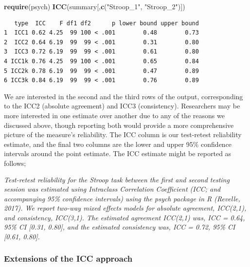 \documentclass[english,,man,floatsintext]{apa6}
\newenvironment{Shaded}{\begin{snugshade}}{\end{snugshade}}
\newcommand{\KeywordTok}[1]{\textcolor[rgb]{0.13,0.29,0.53}{\textbf{#1}}}
\newcommand{\NormalTok}[1]{#1}
\newcommand{\StringTok}[1]{\textcolor[rgb]{0.31,0.60,0.02}{#1}}
\begin{document}
\begin{Shaded}
\begin{Highlighting}[]
\KeywordTok{require}\NormalTok{(psych)}
\KeywordTok{ICC}\NormalTok{(summary[,}\KeywordTok{c}\NormalTok{(}\StringTok{"Stroop_1"}\NormalTok{, }\StringTok{"Stroop_2"}\NormalTok{)])}
\end{Highlighting}
\end{Shaded}

\begin{verbatim}
   type  ICC    F df1 df2      p lower bound upper bound
1  ICC1 0.62 4.25  99 100 < .001        0.48        0.73
2  ICC2 0.64 6.19  99  99 < .001        0.31        0.80
3  ICC3 0.72 6.19  99  99 < .001        0.61        0.80
4 ICC1k 0.76 4.25  99 100 < .001        0.65        0.84
5 ICC2k 0.78 6.19  99  99 < .001        0.47        0.89
6 ICC3k 0.84 6.19  99  99 < .001        0.76        0.89
\end{verbatim}

We are interested in the second and the third rows of the output, corresponding to the ICC2 (absolute agreement) and ICC3 (consistency). Researchers may be more interested in one estimate over another due to any of the reasons we discussed above, though reporting both would provide a more comprehensive picture of the measure's reliability. The ICC column is our test-retest reliability estimate, and the final two columns are the lower and upper 95\% confidence intervals around the point estimate. The ICC estimate might be reported as follows;

\emph{Test-retest reliability for the Stroop task between the first and second testing session was estimated using Intraclass Correlation Coefficient (ICC; and accompanying 95\% confidence intervals) using the psych package in R (Revelle, 2017). We report two-way mixed effects models for absolute agreement, ICC(2,1), and consistency, ICC(3,1). The estimated agreement ICC(2,1) was, ICC = 0.64, 95\% CI {[}0.31, 0.80{]}, and the estimated consistency was, ICC = 0.72, 95\% CI {[}0.61, 0.80{]}.}

\hypertarget{extensions-of-the-icc-approach}{%
\subsubsection{Extensions of the ICC approach}\label{extensions-of-the-icc-approach}}
\end{document}
